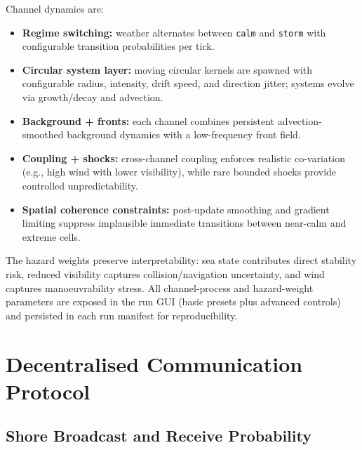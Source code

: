 \documentclass[cameraready]{Interspeech}
\begin{document}
Channel dynamics are:
\begin{itemize}[leftmargin=1.2em, itemsep=2pt]
    \item \textbf{Regime switching:} weather alternates between \texttt{calm} and \texttt{storm} with configurable transition probabilities per tick.
    \item \textbf{Circular system layer:} moving circular kernels are spawned with configurable radius, intensity, drift speed, and direction jitter; systems evolve via growth/decay and advection.
    \item \textbf{Background + fronts:} each channel combines persistent advection-smoothed background dynamics with a low-frequency front field.
    \item \textbf{Coupling + shocks:} cross-channel coupling enforces realistic co-variation (e.g., high wind with lower visibility), while rare bounded shocks provide controlled unpredictability.
    \item \textbf{Spatial coherence constraints:} post-update smoothing and gradient limiting suppress implausible immediate transitions between near-calm and extreme cells.
\end{itemize}
The hazard weights preserve interpretability: sea state contributes direct stability risk, reduced visibility captures collision/navigation uncertainty, and wind captures manoeuvrability stress. All channel-process and hazard-weight parameters are exposed in the run GUI (basic presets plus advanced controls) and persisted in each run manifest for reproducibility.

\section{Decentralised Communication Protocol}
\label{sec:comms}

\subsection{Shore Broadcast and Receive Probability}
\end{document}
